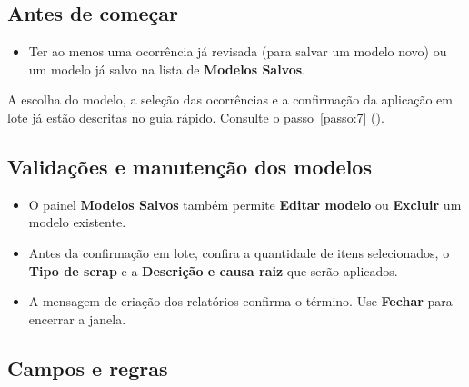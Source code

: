 \subsection*{Antes de começar}

\begin{itemize}
\item Ter ao menos uma ocorrência já revisada (para salvar um modelo novo) ou um modelo já salvo na lista de \textbf{Modelos Salvos}.
\end{itemize}


\begin{remark}[info]
A escolha do modelo, a seleção das ocorrências e a confirmação da aplicação em lote já estão descritas no guia rápido. Consulte o passo~\ref{passo:7} ().
\end{remark}
\subsection*{Validações e manutenção dos modelos}
\begin{itemize}
\item O painel \textbf{Modelos Salvos} também permite \textbf{Editar modelo} ou \textbf{Excluir} um modelo existente.
\item Antes da confirmação em lote, confira a quantidade de itens selecionados, o \textbf{Tipo de scrap} e a \textbf{Descrição e causa raiz} que serão aplicados.
\item A mensagem de criação dos relatórios confirma o término. Use \textbf{Fechar} para encerrar a janela.
\end{itemize}


\Needspace{160pt}

\subsection*{Campos e regras}

